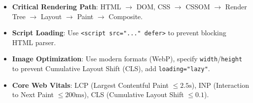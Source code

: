\documentclass[a4paper,11pt]{article}
\begin{document}
\begin{examalert}
\begin{itemize}[leftmargin=*]
    \item \textbf{Critical Rendering Path}: HTML $\to$ DOM, CSS $\to$ CSSOM $\to$ Render Tree $\to$ Layout $\to$ Paint $\to$ Composite.
    \item \textbf{Script Loading}: Use \texttt{<script src="..." defer>} to prevent blocking HTML parser.
    \item \textbf{Image Optimization}: Use modern formats (WebP), specify \texttt{width}/\texttt{height} to prevent Cumulative Layout Shift (CLS), add \texttt{loading="lazy"}.
    \item \textbf{Core Web Vitals}: LCP (Largest Contentful Paint $\le 2.5\text{s}$), INP (Interaction to Next Paint $\le 200\text{ms}$), CLS (Cumulative Layout Shift $\le 0.1$).
\end{itemize}
\end{examalert}
\end{document}
